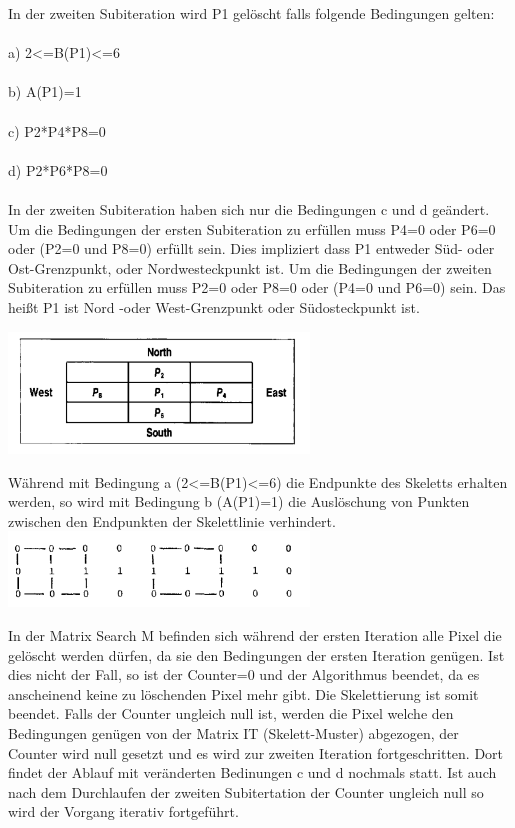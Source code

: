 In der zweiten Subiteration wird P1 gelöscht falls folgende Bedingungen gelten: \\ \\
a) 2<=B(P1)<=6 \\ \\
b) A(P1)=1 \\ \\
c) P2*P4*P8=0 \\ \\
d) P2*P6*P8=0 \\ \\
In der zweiten Subiteration haben sich nur die Bedingungen c und d geändert.\\

Um die Bedingungen der ersten Subiteration zu erfüllen muss
P4=0 oder P6=0 oder (P2=0 und P8=0)  erfüllt sein.
Dies impliziert dass P1 entweder Süd- oder Ost-Grenzpunkt, oder Nordwesteckpunkt ist.
Um die Bedingungen der zweiten Subiteration zu erfüllen muss
P2=0 oder P8=0 oder (P4=0 und P6=0) sein.
Das heißt P1 ist Nord -oder West-Grenzpunkt oder Südosteckpunkt ist.

\includegraphics[width=8cm]{Res/Orientierung.png}


Während mit Bedingung a (2<=B(P1)<=6) die Endpunkte des Skeletts erhalten werden, so wird mit Bedingung b (A(P1)=1) die Auslöschung von Punkten zwischen den Endpunkten der Skelettlinie verhindert.\\

\includegraphics[width=8cm]{Res/EndpktVerbheit.png}

In der Matrix Search M befinden sich während der ersten Iteration alle Pixel die gelöscht werden dürfen, da sie den Bedingungen der ersten Iteration genügen. Ist dies nicht der Fall, so ist der Counter=0 und der Algorithmus beendet, da es anscheinend keine zu löschenden Pixel mehr gibt. Die Skelettierung ist somit beendet.
Falls der Counter ungleich null ist, werden die Pixel welche den Bedingungen genügen von der Matrix IT (Skelett-Muster) abgezogen, der Counter wird null gesetzt und es wird zur zweiten Iteration fortgeschritten. Dort findet der Ablauf mit veränderten Bedinungen c und d nochmals statt. Ist auch nach dem Durchlaufen der zweiten Subitertation der Counter ungleich null so wird der Vorgang iterativ fortgeführt.\\




